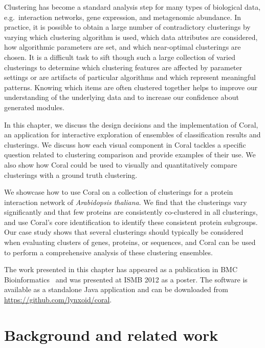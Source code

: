 \documentclass[12pt]{cmuthesis}
\makeatletter
\newcommand\Coral{Coral\xspace}
\newcommand{\eg}{e.g.\@}
\makeatother
\begin{document}
  Clustering has become a standard analysis step for many types of biological data, \eg~interaction networks, gene expression, and metagenomic abundance. In practice, it is possible to obtain a large number of contradictory clusterings by varying which clustering algorithm is used, which data attributes are considered, how algorithmic parameters are set, and  which near-optimal clusterings are chosen. It is a difficult task to sift though such a large collection of varied clusterings to determine which clustering features are affected by parameter settings or are artifacts of particular algorithms and which represent meaningful patterns. Knowing which items are often clustered together helps to improve our understanding of the underlying data and to increase our confidence about generated modules.

  In this chapter, we discuss the design decisions and the implementation of \Coral, an application for interactive exploration of ensembles of classification results and clusterings. We discuss how each visual component in \Coral tackles a specific question related to clustering comparison and provide examples of their use. We also show how \Coral could be used to visually and quantitatively compare clusterings with a ground truth clustering. 

  We showcase how to use \Coral on a collection of clusterings for a protein interaction network of \textit{Arabidopsis thaliana}. We find that the clusterings vary significantly and that few proteins are consistently co-clustered in all clusterings, and use \Coral's core identification to identify these consistent protein subgroups. Our case study shows that several clusterings should typically be considered when evaluating clusters of genes, proteins, or sequences, and Coral can be used to perform a comprehensive analysis of these clustering ensembles.

  The work presented in this chapter has appeared as a publication in BMC Bioinformatics~\cite{Filippova2012} and was presented at ISMB 2012 as a poster. The software is available as a standalone Java application and can be downloaded from \url{https://github.com/lynxoid/coral}.

\section{Background and related work}
\end{document}

